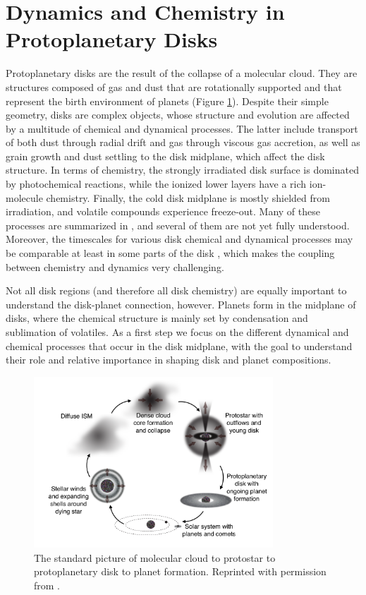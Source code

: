 \section{Dynamics and Chemistry in Protoplanetary Disks}

Protoplanetary disks are the result of the collapse of a molecular cloud. They are structures composed of gas and dust that are rotationally supported and that represent the birth environment of planets (Figure \ref{fig:proto}). Despite their simple geometry, disks are complex objects, whose structure and evolution are affected by a multitude of chemical and dynamical processes. The latter include transport of both dust through radial drift and gas through viscous gas accretion, as well as grain growth and dust settling to the disk midplane, which affect the disk structure. In terms of chemistry, the strongly irradiated disk surface is dominated by photochemical reactions, while the ionized lower layers have a rich ion-molecule chemistry. Finally, the cold disk midplane is mostly shielded from irradiation, and volatile compounds experience freeze-out.  Many of these processes are summarized in \citet{henning13}, and several of them are not yet fully understood.  Moreover, the timescales for various disk chemical and dynamical processes may be comparable at least in some parts of the disk \citep{semenov11}, which makes the coupling between chemistry and dynamics very challenging. 

Not all disk regions (and therefore all disk chemistry) are equally important to understand the disk-planet connection, however. Planets form in the midplane of disks, where the chemical structure is mainly set by condensation and sublimation of volatiles. As a first step we focus on the different dynamical and chemical processes that occur in the disk midplane, with the goal to understand their role and relative importance in shaping disk and planet compositions. 

\begin{figure}[h]
\centering
\includegraphics[width=0.8\textwidth]{figures/proto.pdf}
\caption{The standard picture of molecular cloud to protostar to protoplanetary disk to planet formation. Reprinted with permission from \citet{oberg09}.}
\label{fig:proto}
\end{figure}

